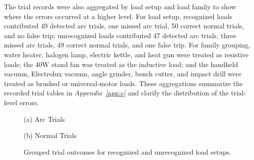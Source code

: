 The trial records were also aggregated by load setup and load family to show
where the errors occurred at a higher level. For load setup, recognized loads
contributed 49 detected arc trials, one missed arc trial, 50 correct normal
trials, and no false trip; unrecognized loads contributed 47 detected arc
trials, three missed arc trials, 49 correct normal trials, and one false trip.
For family grouping, water heater, halogen lamp, electric kettle, and heat gun
were treated as resistive loads; the 40W stand fan was treated as the inductive
load; and the handheld vacuum, Electrolux vacuum, angle grinder, bench cutter,
and impact drill were treated as brushed or universal-motor loads. These
aggregations summarize the recorded trial tables in
\textit{Appendix~\ref{app:e}} and clarify the distribution of the trial-level
errors.

\begin{figure}[H]
  \centering
  \begin{minipage}{0.47\textwidth}
    \centering
    {\small (a) Arc Trials}
  \end{minipage}\hfill
  \begin{minipage}{0.47\textwidth}
    \centering
    {\small (b) Normal Trials}
  \end{minipage}
  \caption{Grouped trial outcomes for recognized and unrecognized load setups.}
  \label{fig:ch4-setup-outcomes}
\end{figure}


